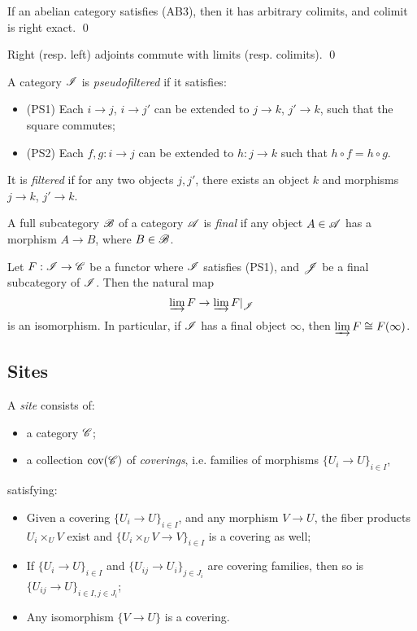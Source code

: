 \documentclass[11pt]{amsart}
\begin{document}
\begin{prop}
    If an abelian category satisfies (AB3), then it has arbitrary colimits, and colimit is right exact. \qed
\end{prop}


\begin{prop}
    Right (resp. left) adjoints commute with limits (resp. colimits). \qed
\end{prop}


\begin{defn}
    A category $\mathscr{I}$ is \emph{pseudofiltered} if it satisfies:
    \begin{itemize}
        \item (PS1) Each $i\to j$, $i\to j'$ can be extended to $j\to k$, $j'\to k$, such that the square commutes;
        \item (PS2) Each $f,g: i\to j$ can be extended to $h:j\to k$ such that $h\circ f = h\circ g$.
    \end{itemize}
    It is \emph{filtered} if for any two objects $j,j'$, there exists an object $k$ and morphisms $j\to k$, $j'\to k$.
\end{defn}


\begin{defn}
    A full subcategory $\mathscr{B}$ of a category $\mathscr{A}$ is \emph{final} if any object $A\in \mathscr{A}$ has a morphism $A\to B$, where $B\in \mathscr{B}$.
\end{defn}


\begin{prop}
    Let $F: \mathscr{I}\to \mathscr{C}$ be a functor where $\mathscr{I}$ satisfies (PS1), and $\mathscr{J}$ be a final subcategory of $\mathscr{I}$. Then the natural map
    \[\varinjlim F \to \varinjlim F|_{\mathscr{J}}\]
    is an isomorphism. In particular, if $\mathscr{I}$ has a final object $\infty$, then $\varinjlim F \cong F(\infty)$.
\end{prop}


\subsection{Sites}


\begin{defn}[sites]
    A \emph{site} consists of:
    \begin{itemize}
        \item a category $\mathscr{C}$;
        \item a collection $\operatorname{cov}(\mathscr{C})$ of \emph{coverings}, i.e. families of morphisms $\{U_i\to U\}_{i\in I}$,
    \end{itemize}
    satisfying:
    \begin{itemize}
        \item Given a covering $\{U_i\to U\}_{i\in I}$, and any morphism $V\to U$, the fiber products $U_i\times_U V$ exist and $\{U_i\times_U V\to V\}_{i\in I}$ is a covering as well;
        \item If $\{U_i\to U\}_{i\in I}$ and $\{U_{ij}\to U_i\}_{j\in J_i}$ are covering families, then so is $\{U_{ij}\to U\}_{i\in I, j\in J_i}$;
        \item Any isomorphism $\{V\to U\}$ is a covering.
    \end{itemize}
\end{defn}
\end{document}
